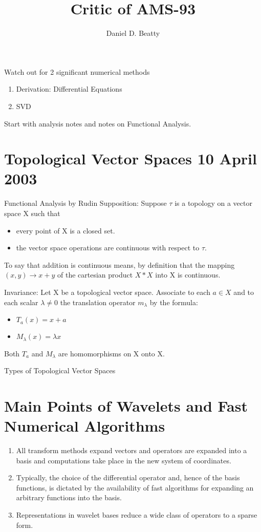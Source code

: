 \documentclass[11pt]{article}
\title{Critic of AMS-93}
\author{Daniel D. Beatty}
\begin{document}
\maketitle

Watch out for 2 significant numerical methods 
\begin{enumerate}
\item Derivation: Differential Equations 
\item SVD
\end{enumerate}

Start with analysis notes and notes on Functional Analysis.

\section {Topological Vector Spaces 10 April 2003}
Functional Analysis by Rudin 
Supposition:  Suppose $\tau$ is a topology on a vector space X such that 
\begin{itemize}
\item every point of X is a closed set.
\item the vector space operations are continuous with respect to $\tau$.
\end{itemize}

To say that addition is continuous means, by definition that the mapping $(x,y) \rightarrow x+y$ of the cartesian product $X*X$ into X is continuous.  

Invariance: Let X be a topological vector space.  Associate to each $a\in X$ and to each scalar $\lambda \not= 0$ the translation operator $m_{\lambda}$ by the formula:

\begin{itemize}
\item $T_a (x)=x+a$
\item $M_{\lambda} (x) = \lambda x$
\end{itemize}

Both $T_a$ and $M_{\lambda}$ are homomorphisms on X onto X.

Types of Topological Vector Spaces

\section{Main Points of Wavelets and Fast Numerical Algorithms}

\begin{enumerate}
\item All transform methods expand vectors and operators are expanded into a basis and computations take place in the new system of coordinates.
\item Typically, the choice of the differential operator and, hence of the basis functions, is dictated by the availability of fast algorithms for expanding an arbitrary functions into the basis.
\item Representations in wavelet bases reduce a wide class of operators to a sparse form.
\end{enumerate}
\end{document}
